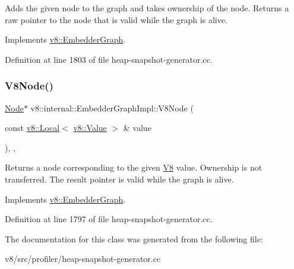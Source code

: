 Adds the given node to the graph and takes ownership of the node. Returns a raw pointer to the node that is valid while the graph is alive. 

Implements \mbox{\hyperlink{classv8_1_1EmbedderGraph_a57afbce6126e5cd82b66f66b018a18e2}{v8\+::\+Embedder\+Graph}}.



Definition at line 1803 of file heap-\/snapshot-\/generator.\+cc.

\mbox{\label{classv8_1_1internal_1_1EmbedderGraphImpl_aa205df27c645b256ba9f5e8bbbb08497}} 
\subsubsection{\texorpdfstring{V8\+Node()}{V8Node()}}
{\footnotesize\ttfamily \mbox{\hyperlink{classv8_1_1EmbedderGraph_1_1Node}{Node}}$\ast$ v8\+::internal\+::\+Embedder\+Graph\+Impl\+::\+V8\+Node (\begin{DoxyParamCaption}\item[{const \mbox{\hyperlink{classv8_1_1Local}{v8\+::\+Local}}$<$ \mbox{\hyperlink{classv8_1_1Value}{v8\+::\+Value}} $>$ \&}]{value }\end{DoxyParamCaption})\hspace{0.3cm}{\ttfamily [inline]}, {\ttfamily [final]}, {\ttfamily [virtual]}}

Returns a node corresponding to the given \mbox{\hyperlink{classv8_1_1internal_1_1V8}{V8}} value. Ownership is not transferred. The result pointer is valid while the graph is alive. 

Implements \mbox{\hyperlink{classv8_1_1EmbedderGraph_a6fdb5451611738dd44c70d195445d0ff}{v8\+::\+Embedder\+Graph}}.



Definition at line 1797 of file heap-\/snapshot-\/generator.\+cc.



The documentation for this class was generated from the following file\+:\begin{DoxyCompactItemize}
\item 
v8/src/profiler/heap-\/snapshot-\/generator.\+cc\end{DoxyCompactItemize}
